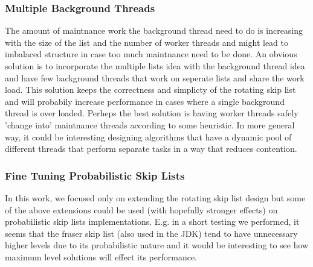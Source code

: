 \documentclass{article}
\begin{document}
\subsubsection{Multiple Background Threads}
\label{sssec:fr-1}
The amount of maintnance work the background thread need to do is increasing with the size of the list and the number of worker threads and might lead to imbalaced structure in case too much maintnance need to be done. An obvious solution is to incorporate the multiple lists idea with the background thread idea and have few background threads that work on seperate lists and share the work load. This solution keeps the correctness and simplicty of the rotating skip list and will probabily increase performance in cases where a single background thread is over loaded. Perheps the best solution is having worker threads safely 'change into' maintnance threads according to some heuristic. In more general way, it could be interesting designing algorithms that have a dynamic pool of different threads that perform separate tasks in a way that reduces contention.

\subsubsection{Fine Tuning Probabilistic Skip Lists}
\label{sssec:fr-2}

In this work, we focused only on extending the rotating skip list design but some of the above extensions could be used (with hopefully stronger effects) on probabilistic skip lists implementations. E.g. in a short testing we performed, it seems that the fraser skip list (also used in the JDK) tend to have unnecessary higher levels due to its probabilistic nature and it would be interesting to see how maximum level solutions will effect its performance.







\end{document}
